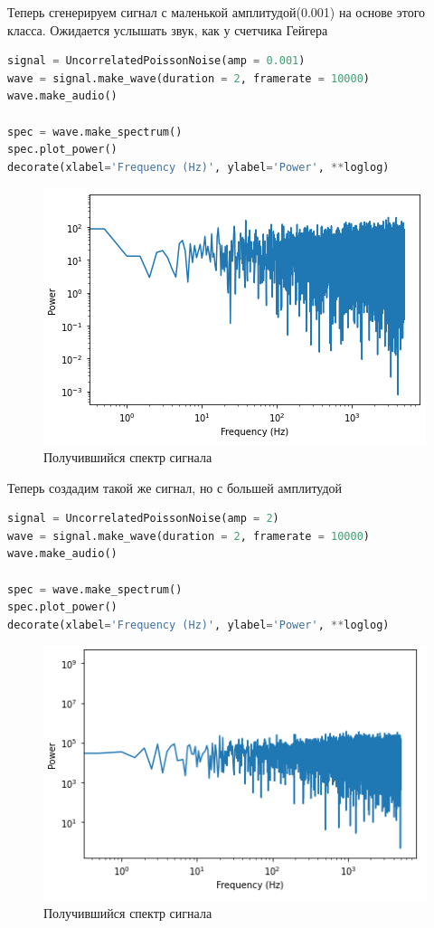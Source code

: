 Теперь сгенерируем сигнал с маленькой амплитудой(0.001) на основе этого класса. Ожидается услышать звук, как у счетчика Гейгера

\begin{lstlisting}[language=Python]
signal = UncorrelatedPoissonNoise(amp = 0.001)
wave = signal.make_wave(duration = 2, framerate = 10000)
wave.make_audio()

spec = wave.make_spectrum()
spec.plot_power()
decorate(xlabel='Frequency (Hz)', ylabel='Power', **loglog)
\end{lstlisting}

\begin{figure}[H]
	\begin{center}
		\includegraphics[scale=1]{fig/lab04/lab04_10.png}
		\caption{Получившийся спектр сигнала}
	\end{center}
\end{figure}

Теперь создадим такой же сигнал, но с большей амплитудой

\begin{lstlisting}[language=Python]
signal = UncorrelatedPoissonNoise(amp = 2)
wave = signal.make_wave(duration = 2, framerate = 10000)
wave.make_audio()

spec = wave.make_spectrum()
spec.plot_power()
decorate(xlabel='Frequency (Hz)', ylabel='Power', **loglog)
\end{lstlisting}

\begin{figure}[H]
	\begin{center}
		\includegraphics[scale=1]{fig/lab04/lab04_11.png}
		\caption{Получившийся спектр сигнала}
	\end{center}
\end{figure}

